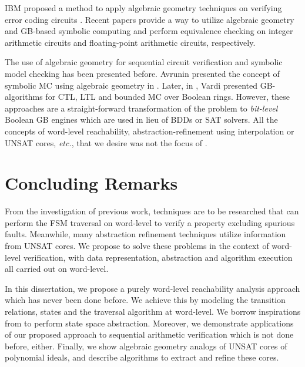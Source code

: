 IBM proposed a method to apply algebraic geometry techniques 
on verifying error coding circuits \cite{BLUEVERI}.
Recent papers \cite{rolf:date16,rolf:FMCAD16} provide a way to utilize 
algebraic geometry and GB-based symbolic computing and perform 
equivalence checking on integer arithmetic circuits and floating-point 
arithmetic circuits, respectively.

The use of algebraic geometry
for sequential circuit verification and symbolic model checking has
been presented before. Avrunin presented the
concept of symbolic MC using algebraic geometry in
\cite{Avrunin:CAV}. Later, in \cite{vardi-iasted07}, Vardi presented
GB-algorithms for CTL, LTL and 
bounded MC over Boolean rings. However, these approaches are a
straight-forward transformation of the problem to {\it bit-level}
Boolean GB engines which are used in lieu of BDDs or SAT solvers. All
the concepts of word-level reachability, abstraction-refinement using
interpolation or UNSAT cores, {\it etc.}, that we desire was not the focus of
\cite{Avrunin:CAV,vardi-iasted07}. 

\section{Concluding Remarks}
From the investigation of previous work, techniques are to be researched that 
can perform the FSM traversal on word-level to verify a property excluding spurious 
faults. Meanwhile, many abstraction refinement techniques utilize information from UNSAT cores.
We propose to solve these problems in the context of word-level verification,
with data representation, abstraction and algorithm execution all carried out 
on word-level.

In this dissertation, we propose a purely word-level reachability analysis approach which has never been done before.
We achieve this by modeling the transition relations, states and the traversal algorithm at word-level.
We borrow inspirations from \cite{tim:phd,gao:qe-gf-gb} to perform state space abstraction.
Moreover, we demonstrate applications of our proposed approach to sequential arithmetic verification which is 
not done before, either.
Finally, we show algebraic geometry analogs of UNSAT cores of polynomial ideals, and describe algorithms
to extract and refine these cores.